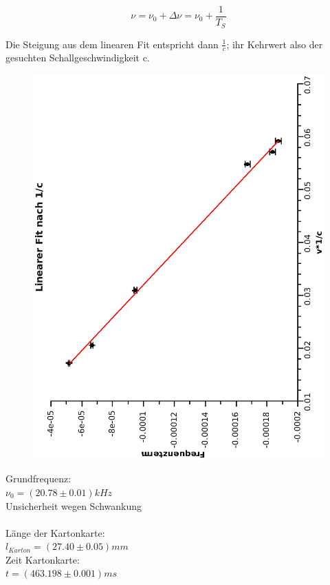 \documentclass{article}
\begin{document}
\begin{equation}
\nu=\nu_0+\Delta \nu = \nu_0 + \frac{1}{T_S}
\end{equation}

Die Steigung aus dem linearen Fit entspricht dann $\frac{1}{c}$; ihr Kehrwert also der gesuchten Schallgeschwindigkeit c.

\begin{figure}
\includegraphics[scale=0.4,angle=-90]{dopplerfit.eps}
\end{figure}

Grundfrequenz:\\
$\nu_0=(20.78 \pm 0.01)\si{kHz}$\\
Unsicherheit wegen Schwankung\\
\\
Länge der Kartonkarte:\\
$l_{Karton}=(27.40 \pm 0.05)\si{mm}$\\

Zeit Kartonkarte:\\
$t=(463.198 \pm 0.001)\si{ms}$\\
\end{document}
